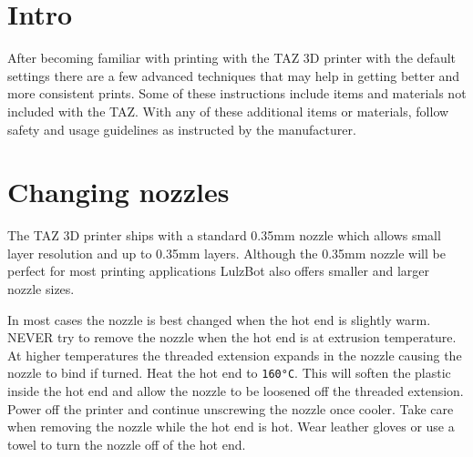 \section{Intro}
After becoming familiar with printing with the TAZ 3D printer with the default settings there are a few advanced techniques that may help in getting better and more consistent prints. Some of these instructions include items and materials not included with the TAZ. With any of these additional items or materials, follow safety and usage guidelines as instructed by the manufacturer.

\section{Changing nozzles}
The TAZ 3D printer ships with a standard 0.35mm nozzle which allows small layer resolution and up to 0.35mm layers. Although the 0.35mm nozzle will be perfect for most printing applications LulzBot also offers smaller and larger nozzle sizes.

In most cases the nozzle is best changed when the hot end is slightly warm. NEVER try to remove the nozzle when the hot end is at extrusion temperature. At higher temperatures the threaded extension expands in the nozzle causing the nozzle to bind if turned. Heat the hot end to \texttt{160°C}. This will soften the plastic inside the hot end and allow the nozzle to be loosened off the threaded extension. Power off the printer and continue unscrewing the nozzle once cooler. Take care when removing the nozzle while the hot end is hot. Wear leather gloves or use a towel to turn the nozzle off of the hot end.

